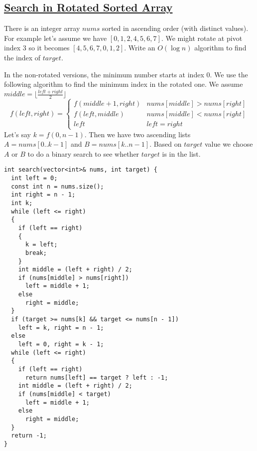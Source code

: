 \documentclass{book}
\begin{document}
	\subsection{\href{https://leetcode.com/problems/search-in-rotated-sorted-array/}{Search in Rotated Sorted Array}}
	There is an integer array $nums$ sorted in ascending order (with distinct values). For example let's assume we have $[0,1,2,4,5,6,7]$. We might rotate at pivot index $3$ so it becomes $[4,5,6,7,0,1,2]$. Write an $O(\log{n})$ algorithm to find the index of $target$.
	\par In the non-rotated versions, the minimum number starts at index $0$. We use the following algorithm to find the minimum index in the rotated one. We assume $middle = \lfloor \frac{left + right}{2} \rfloor$
	\begin{equation*}
		f(left, right) = \begin{cases}
			f(middle + 1, right) & nums[middle] > nums[right] \\
			f(left, middle) & nums[middle] < nums[right] \\
			left & left = right			
		\end{cases}
	\end{equation*}
	Let's say $k = f(0, n - 1)$. Then we have two ascending lists $A = nums[0.. k - 1]$ and $B = nums[k..n - 1]$. Based on $target$ value we choose $A$ or $B$ to do a binary search to see whether $target$ is in the list.
	\begin{lstlisting}
int search(vector<int>& nums, int target) {
  int left = 0;
  const int n = nums.size();
  int right = n - 1;
  int k;
  while (left <= right)
  {
    if (left == right)
    {
      k = left;
      break;
    }
    int middle = (left + right) / 2;
    if (nums[middle] > nums[right])
      left = middle + 1;
    else
      right = middle;
  }
  if (target >= nums[k] && target <= nums[n - 1])
    left = k, right = n - 1;
  else
    left = 0, right = k - 1;
  while (left <= right)
  {
    if (left == right)
      return nums[left] == target ? left : -1;
    int middle = (left + right) / 2;
    if (nums[middle] < target)
      left = middle + 1;
    else
      right = middle;
  }
  return -1;
}
	\end{lstlisting}
\end{document}
